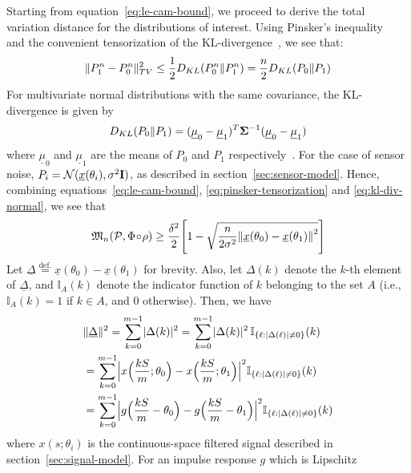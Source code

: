 \documentclass[conference,letterpaper]{IEEEtran}
\providecommand{\v}{}
\renewcommand{\v}[1]{\underline{#1}}
\providecommand{\m}{}
\renewcommand{\m}[1]{{\bf #1}}
\DeclarePairedDelimiter\abs{\lvert}{\rvert}
\DeclarePairedDelimiter\norm{\lVert}{\rVert}
\newcommand{\Phiorho}{\Phi\!\circ\!\rho}
\begin{document}
\begin{IEEEproof}
Starting from equation~\eqref{eq:le-cam-bound}, we proceed to derive the total
variation distance for the distributions of interest. Using Pinsker's
inequality~\cite{Kullback1967Lower} and the convenient tensorization of the
KL-divergence~\cite{Duchi2015Information}, we see that:
\begin{equation} \label{eq:pinsker-tensorization}
	\norm{P_1^n - P_0^n}_{TV}^2 \leq \frac{1}{2} D_{KL}(P_0^n \Vert P_1^n) = \frac{n}{2} D_{KL}(P_0 \Vert P_1)
\end{equation}
For multivariate normal distributions with the same covariance, the
KL-divergence is given by
\begin{equation} \label{eq:kl-div-normal}
	D_{KL}(P_0 \Vert P_1) = (\v \mu_0 - \v \mu_1)^T \m \Sigma^{-1} (\v \mu_0 - \v \mu_1)
\end{equation}
where $\v \mu_0$ and $\v \mu_1$ are the means of $P_0$ and $P_1$
respectively~\cite{DuchiDerivation}. For the case of sensor noise, $P_i =
\mathcal{N}(\v x(\theta_i), \sigma^2 \m I)$, as described in
section~\ref{sec:sensor-model}. Hence, combining
equations~\eqref{eq:le-cam-bound}, \eqref{eq:pinsker-tensorization} and
\eqref{eq:kl-div-normal}, we see that
\begin{equation} \label{eq:lb-after-pinsker}
	\mathfrak{M}_n(\mathcal{P}, \Phiorho) \geq \frac{\delta^2}{2} \Bigg[ 1 - \sqrt{ \frac{n}{2\sigma^2} \norm*{\v x(\theta_0) - \v x(\theta_1)}^2 } \Bigg]
\end{equation}
Let $\v \Delta \overset{\text{def.}}{=} \v x(\theta_0) - \v x(\theta_1)$ for
brevity. Also, let $\Delta(k)$ denote the $k$-th element of $\v\Delta$, and
$\mathbb I_A(k)$ denote the indicator function of $k$ belonging to the set $A$
(i.e., $\mathbb I_A(k) = 1$ if $k \in A$, and $0$ otherwise). Then, we have
\begin{align}
	&\norm{\v\Delta}^2 = \sum_{k=0}^{m-1} \abs{\Delta(k)}^2 = \sum_{k=0}^{m-1} \abs{\Delta(k)}^2 \, \mathbb I_{\{\ell: \abs{\Delta(\ell)} \neq 0\}}(k) \\
	&= \sum_{k=0}^{m-1} \abs[\Big]{x\Big(\frac{kS}{m}; \theta_0\Big) - x\Big(\frac{kS}{m}; \theta_1\Big)}^2 \mathbb I_{\{\ell: \abs{\Delta(\ell)} \neq 0\}}(k) \\
	&= \sum_{k=0}^{m-1} \abs[\Big]{g\Big(\frac{kS}{m} - \theta_0\Big) - g\Big(\frac{kS}{m} - \theta_1\Big)}^2 \mathbb I_{\{\ell: \abs{\Delta(\ell)} \neq 0\}}(k)
\end{align}
where $x(s;\theta_i)$ is the continuous-space filtered signal described in
section~\ref{sec:signal-model}. For an impulse response $g$ which is Lipschitz

\end{IEEEproof}
\end{document}

